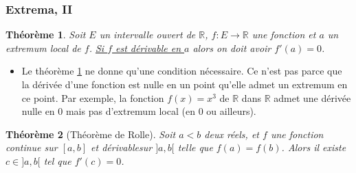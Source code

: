 \documentclass[10pt,notheorems]{beamer}
\theoremstyle{plain}
\newtheorem{theorem}{Théorème}
\theoremstyle{definition} %
\begin{document}
\begin{frame}
  \frametitle{Extrema, II}
  \hypertarget{slide_extrema_2}{}

  \begin{theorem}\label{thm:local_extrema}
    Soit $E$  un intervalle ouvert de $\mathbb R$, $f: E\rightarrow \mathbb R$ une fonction et $a$ un extremum local de $f$. \underline{Si $f$ est dérivable en $a$} alors on doit avoir $f'(a)=0$.
  \end{theorem}

  \bigskip

  \begin{itemize}
  \item[\dbend] Le théorème \hyperlink{slide_extrema_2}{\ref{thm:local_extrema}} ne donne qu'une condition nécessaire. Ce n'est pas parce que la dérivée d'une fonction est nulle en un point qu'elle admet un extremum en ce point. Par exemple, la fonction $f(x)=x^3$ de $\mathbb R$ dans $\mathbb R$ admet une dérivée nulle en 0 mais pas d'extremum local (en 0 ou ailleurs).\newline
  \end{itemize}

  \begin{theorem}[Théorème de Rolle]\label{thm:rolle}
    Soit $a < b$ deux réels, et $f$  une fonction continue sur $[a, b]$ et dérivablesur $]a, b[$ telle que $f(a) = f(b)$. Alors il existe $c\in]a, b[$ tel que $f'(c) = 0$.
  \end{theorem}

\end{frame}
\end{document}
